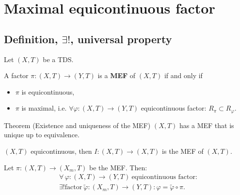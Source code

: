\section{Maximal equicontinuous factor}
\subsection{Definition, $\exists!$, universal property}
\begin{frame}
  Let $(X,T)$ be a TDS.
  \begin{definition}
    A factor $\pi : (X,T) \to (Y,T)$ is a \textbf{MEF} of $(X,T)$ if and only if
  \begin{itemize}
    \item $\pi$ is equicontinuous,
    \item $\pi$ is maximal, i.e. $\forall \varphi : (X,T) \to (Y,T)$ equicontinuous factor: $R_\pi \subset R_\varphi$.
  \end{itemize}
\end{definition}
\pause
  \begin{alertblock}{Theorem (Existence and uniqueness of the MEF)}
  $(X,T)$ has a MEF that is unique up to equivalence.
  \end{alertblock}
  \pause
\begin{example}
  $(X,T)$ equicontinuous, then $I: (X,T) \to (X,T)$ is the MEF of $(X,T)$.
\end{example}

\end{frame}
\begin{frame}[fragile]
\begin{proposition}
  Let $\pi : (X, T) \to  (X_m,T)$ be the MEF.
  Then:
  \begin{equation*}
    \begin{split}
      &\forall \, \varphi : (X,T) \to (Y,T) \ \text{equicontinuous factor}: \\
      & \exists! \text{factor} \ \tilde{\varphi}: (X_m,T) \to (Y,T): \varphi = \tilde{\varphi} \circ \pi.
    \end{split}
      \end{equation*}
  \end{proposition}
  \begin{center}
  \end{center}
\end{frame}
